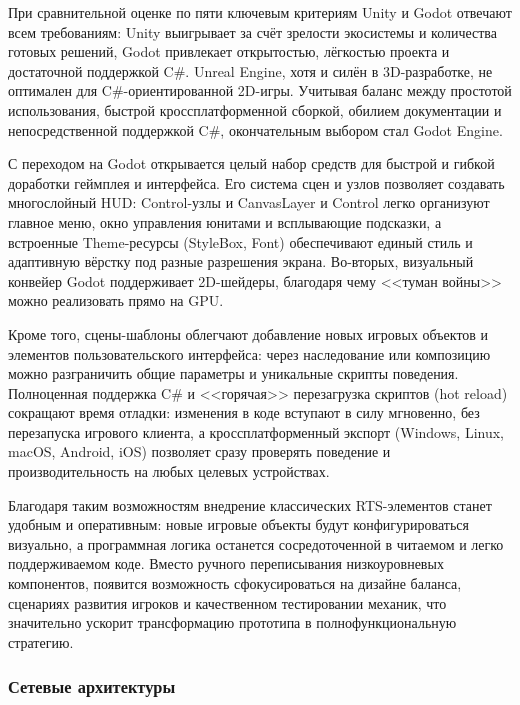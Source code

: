         При сравнительной оценке по пяти ключевым критериям Unity и Godot отвечают всем требованиям: Unity выигрывает за счёт зрелости экосистемы и количества готовых решений, 
        Godot привлекает открытостью, лёгкостью проекта и достаточной поддержкой C\#. Unreal Engine, хотя и силён в 3D-разработке, не оптимален для C\#-ориентированной 2D-игры. 
        Учитывая баланс между простотой использования, быстрой кроссплатформенной сборкой, обилием документации и непосредственной поддержкой C\#, окончательным выбором стал Godot Engine.

        С переходом на Godot открывается целый набор средств для быстрой и гибкой доработки геймплея и интерфейса. Его система сцен и узлов позволяет 
        создавать многослойный HUD: Control-узлы и CanvasLayer и Control легко организуют главное меню, окно управления юнитами и всплывающие подсказки, 
        а встроенные Theme-ресурсы (StyleBox, Font) обеспечивают единый стиль и адаптивную вёрстку под разные разрешения экрана. Во-вторых, визуальный конвейер Godot 
        поддерживает 2D-шейдеры, благодаря чему <<туман войны>> можно реализовать прямо на GPU.

        Кроме того, сцены-шаблоны облегчают добавление новых игровых объектов и элементов пользовательского интерфейса: через наследование или композицию можно разграничить общие параметры 
        и уникальные скрипты поведения. Полноценная поддержка C\# и <<горячая>> перезагрузка скриптов (hot reload) сокращают время отладки: изменения в коде вступают в силу мгновенно, 
        без перезапуска игрового клиента, а кроссплатформенный экспорт (Windows, Linux, macOS, Android, iOS) позволяет сразу проверять поведение и производительность на любых целевых устройствах.

        Благодаря таким возможностям внедрение классических RTS-элементов станет удобным и оперативным: новые игровые объекты будут конфигурироваться визуально, а программная логика 
        останется сосредоточенной в читаемом и легко поддерживаемом коде. Вместо ручного переписывания низкоуровневых компонентов, появится возможность сфокусироваться на дизайне 
        баланса, сценариях развития игроков и качественном тестировании механик, что значительно ускорит трансформацию прототипа в полнофункциональную стратегию.

        \subsubsection{Сетевые архитектуры}

